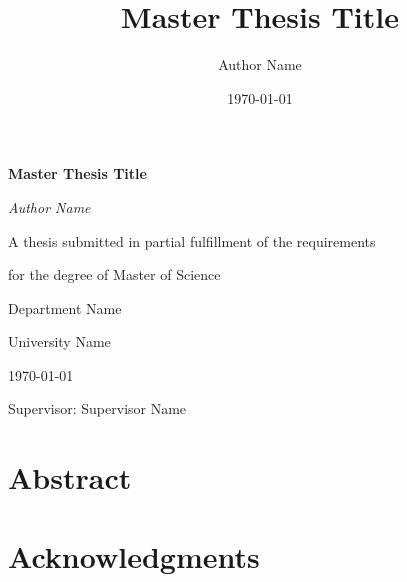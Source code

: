 \documentclass[12pt,a4paper,oneside]{report}
\title{Master Thesis Title}
\author{Author Name}
\date{\today}
\begin{document}
\begin{titlepage}
    \centering
    \vspace*{2cm}
    
    {\Huge\bfseries Master Thesis Title\par}
    \vspace{1.5cm}
    
    {\Large\itshape Author Name\par}
    \vspace{1cm}
    
    {\large A thesis submitted in partial fulfillment of the requirements\par}
    {\large for the degree of Master of Science\par}
    \vspace{1cm}
    
    {\large Department Name\par}
    {\large University Name\par}
    \vspace{1cm}
    
    {\large \today\par}
    
    \vfill
    
    {\large Supervisor: Supervisor Name\par}
\end{titlepage}

\chapter*{Abstract}


\chapter*{Acknowledgments}


\tableofcontents
\cleardoublepage

\listoffigures
{}
\cleardoublepage

\listoftables
{}
\cleardoublepage










\appendix

\end{document}
